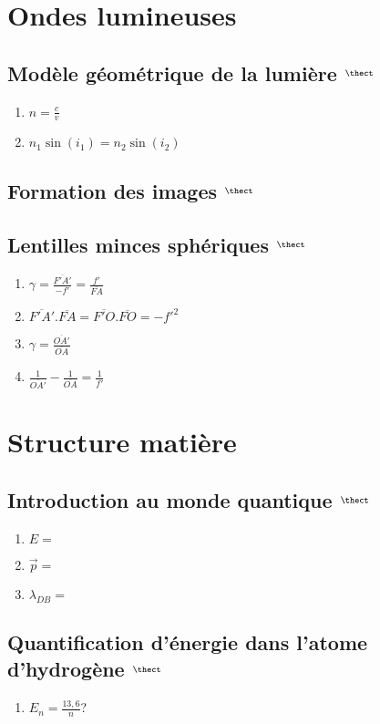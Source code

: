 \documentclass[fleqn]{article}
\theoremstyle{definition} \newtheorem*{defi}{D\'efinition}
\theoremstyle{definition} \newtheorem*{theo}{Th\'eor\`eme}
\theoremstyle{definition} \newtheorem*{coro}{Corollaire}
\theoremstyle{remark} \newtheorem*{rqs}{Remarques}
\theoremstyle{definition} \newtheorem*{prop}{Propri\'et\'e}
\begin{document}
\section{Ondes lumineuses}
\subsection{Mod\`ele g\'eom\'etrique de la lumi\`ere $^\thect$}
\begin{enumerate}
	\item $n = \frac{c}{v}$
	\item $n_1 \sin(i_1) = n_2 \sin(i_2)$
\end{enumerate}

\subsection{Formation des images $^\thect$}

\subsection{Lentilles minces sph\'eriques $^\thect$}
\begin{enumerate}
	\item $\gamma = \frac{\overline{F'A'}}{-f'} = \frac{f'}{\overline{FA}}$
	\item $\overline{F'A'}.\overline{FA} = \overline{F'O}.\overline{FO} = -f'^2$
	\item $\gamma = \frac{\overline{OA'}}{\overline{OA}}$
	\item $\frac{1}{\overline{OA'}} - \frac{1}{\overline{OA}} = \frac{1}{f'}$
\end{enumerate}

\section{Structure mati\`ere}
\subsection{Introduction au monde quantique $^{\thect}$}
\begin{enumerate}
	\item $E = $
	\item $\vec{p} = $
	\item $\lambda_{DB} = $
\end{enumerate}

\subsection{Quantification d'\'energie dans l'atome d'hydrog\`ene $^{\thect}$}
\begin{enumerate}
	\item $E_n = \frac{13,6}{n}$?
\end{enumerate}
\end{document}
